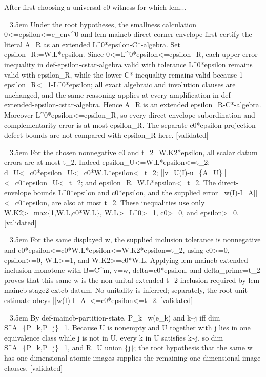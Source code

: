 \documentclass{article}
\newcommand{\step}[1]{\par\noindent\hangindent=3.5em\hangafter=1%
  \makebox[3.5em][l]{\textbf{#1.}}}
\newcommand{\steptag}[1]{\hfill{\small\textsf{[#1]}}}
\begin{document}
\begin{proofbox}{After first choosing a universal c0 witness for which lem...}
\step{1.3.2} Under the root hypotheses, the smallness calculation 0<=epsilon<=e\_env\textasciicircum{}0 and lem-maincb-direct-corner-envelope first certify the literal A\_R as an extended L\textasciicircum{}0*epsilon-C*-algebra. Set epsilon\_R:=W.L*epsilon. Since 0<=L\textasciicircum{}0*epsilon<=epsilon\_R, each upper-error inequality in def-epsilon-cstar-algebra valid with tolerance L\textasciicircum{}0*epsilon remains valid with epsilon\_R, while the lower C*-inequality remains valid because 1-epsilon\_R<=1-L\textasciicircum{}0*epsilon; all exact algebraic and involution clauses are unchanged, and the same reasoning applies at every amplification in def-extended-epsilon-cstar-algebra. Hence A\_R is an extended epsilon\_R-C*-algebra. Moreover L\textasciicircum{}0*epsilon<=epsilon\_R, so every direct-envelope subordination and complementarity error is at most epsilon\_R. The separate c0*epsilon projection-defect bounds are not compared with epsilon\_R here. \steptag{validated} \\[4pt]
\step{1.4} For the chosen nonnegative c0 and t\_2=W.K2*epsilon, all scalar datum errors are at most t\_2. Indeed epsilon\_U<=W.L*epsilon<=t\_2; d\_U<=c0*epsilon\_U<=c0*W.L*epsilon<=t\_2; ||v\_U(I)-u\_\{A\_U\}||<=c0*epsilon\_U<=t\_2; and epsilon\_R=W.L*epsilon<=t\_2. The direct-envelope bounds L\textasciicircum{}0*epsilon and c0*epsilon, and the supplied error ||w(I)-I\_A||<=c0*epsilon, are also at most t\_2. These inequalities use only W.K2>=max\{1,W.L,c0*W.L\}, W.L>=L\textasciicircum{}0>=1, c0>=0, and epsilon>=0. \steptag{validated} \\[4pt]
\step{1.5} For the same displayed w, the supplied inclusion tolerance is nonnegative and c0*epsilon<=c0*W.L*epsilon<=W.K2*epsilon=t\_2, using c0>=0, epsilon>=0, W.L>=1, and W.K2>=c0*W.L. Applying lem-maincb-extended-inclusion-monotone with B=C\textasciicircum{}m, v=w, delta=c0*epsilon, and delta\_prime=t\_2 proves that this same w is the non-unital extended t\_2-inclusion required by lem-maincb-stage2-extcb-datum. No unitality is inferred; separately, the root unit estimate obeys ||w(I)-I\_A||<=c0*epsilon<=t\_2. \steptag{validated} \\[4pt]
\step{1.6} By def-maincb-partition-state, P\_k=w(e\_k) and k\textasciitilde{}j iff dim S\textasciicircum{}A\_\{P\_k,P\_j\}=1. Because U is nonempty and U together with j lies in one equivalence class while j is not in U, every k in U satisfies k\textasciitilde{}j, so dim S\textasciicircum{}A\_\{P\_k,P\_j\}=1, and R=U union \{j\}; the root hypothesis that the same w has one-dimensional atomic images supplies the remaining one-dimensional-image clauses. \steptag{validated} \\[4pt]

\end{proofbox}
\end{document}
